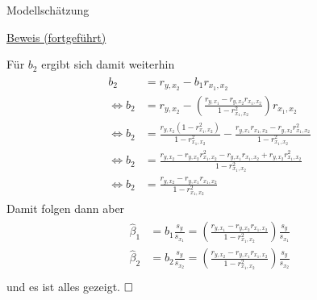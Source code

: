 \documentclass[
  8pt,
  ignorenonframetext,
]{beamer}
\begin{document}
\begin{frame}{Modellschätzung}
\protect\hypertarget{modellschuxe4tzung-11}{}
\footnotesize

\underline{Beweis (fortgeführt)}

Für \(b_2\) ergibt sich damit weiterhin \begin{align}
\begin{split}
b_2 & = r_{y,x_2} - b_1r_{x_1,x_2}
\\
\Leftrightarrow
b_2 & = r_{y,x_2} - \left(\frac{r_{y,x_1} -  r_{y,x_2}r_{x_1,x_2}}{1 - r_{x_1,x_2}^2}\right)r_{x_1,x_2}
\\
\Leftrightarrow
b_2 & = \frac{r_{y,x_2}\left(1 - r_{x_1,x_2}^2\right)}{1 - r_{x_1,x_2}^2} - \frac{r_{y,x_1}r_{x_1,x_2} -  r_{y,x_2}r_{x_1,x_2}^2}{1 - r_{x_1,x_2}^2}
\\
\Leftrightarrow
b_2 & = \frac{r_{y,x_2} - r_{y,x_2}r_{x_1,x_2}^2 - r_{y,x_1}r_{x_1,x_2} +  r_{y,x_2}r_{x_1,x_2}^2}{1 - r_{x_1,x_2}^2}
\\
\Leftrightarrow
b_2 & = \frac{r_{y,x_2} - r_{y,x_1}r_{x_1,x_2}}{1 - r_{x_1,x_2}^2}
\end{split}
\end{align} Damit folgen dann aber \begin{align}
\begin{split}
\hat{\beta}_1 & = b_1 \frac{s_{y}}{s_{x_1}} = \left(\frac{r_{y,x_1} - r_{y,x_2}r_{x_1,x_2}}{1 - r_{x_1,x_2}^2} \right) \frac{s_{y}}{s_{x_1}} \\
\hat{\beta}_2 & = b_2 \frac{s_{y}}{s_{x_2}} = \left(\frac{r_{y,x_2} - r_{y,x_1}r_{x_1,x_2}}{1 - r_{x_1,x_2}^2} \right) \frac{s_{y}}{s_{x_2}} \\
\end{split}
\end{align} und es ist alles gezeigt. \(\hfill\Box\)
\end{frame}
\end{document}
